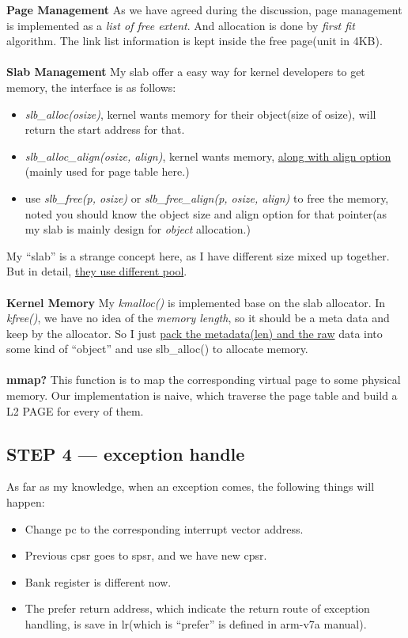 \documentclass{article}
\begin{document}
\textbf{Page Management}
As we have agreed during the discussion, page management is implemented as a \emph{list of free extent}. And allocation is done by \emph{first fit} algorithm. The link list information is kept inside the free page(unit in 4KB).
\\~\\

\textbf{Slab Management}
My slab offer a easy way for kernel developers to get memory, the interface is as follows:
\begin{itemize}
	\item	\emph{slb\_alloc(osize)}, kernel wants memory for their object(size of osize), will return the start address for that.
	\item \emph{slb\_alloc\_align(osize, align)}, kernel wants memory, \underline{along with align option} (mainly used for page table here.)
	\item	use \emph{slb\_free(p, osize)} or \emph{slb\_free\_align(p, osize, align)} to free the memory, noted you should know the object size and align option for that pointer(as my slab is mainly design for \emph{object} allocation.)
\end{itemize}

My ``slab'' is a strange concept here, as I have different size mixed up together. But in detail, \underline{they use different pool}.
\\~\\

\textbf{Kernel Memory}
My \emph{kmalloc()} is implemented base on the slab allocator. In \emph{kfree()}, we have no idea of the \emph{memory length}, so it should be a meta data and keep by the allocator. So I just \underline{pack the metadata(len) and the raw} data into some kind of ``object'' and use slb\_alloc() to allocate memory. 
\\~\\

\textbf{mmap?} This function is to map the corresponding virtual page to some physical memory. Our implementation is naive, which traverse the page table and build a L2 PAGE for every of them.

\subsection{STEP 4 --- exception handle}
As far as my knowledge, when an exception comes, the following things will happen:

\begin{itemize}
	\item	Change pc to the corresponding interrupt vector address.
	\item	Previous cpsr goes to spsr, and we have new cpsr.
	\item	Bank register is different now.
	\item	The prefer return address, which indicate the return route of exception handling, is save in lr(which is ``prefer'' is defined in arm-v7a manual).
\end{itemize}
\end{document}
